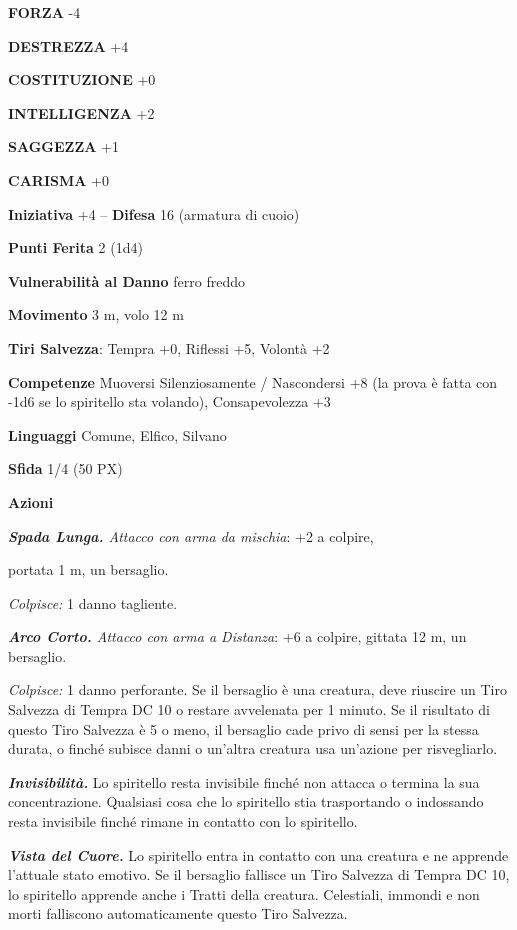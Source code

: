 \begin{multicols}{2}
\textbf{FORZA} -4

\textbf{DESTREZZA} +4

\textbf{COSTITUZIONE} +0

\textbf{INTELLIGENZA} +2

\textbf{SAGGEZZA} +1

\textbf{CARISMA} +0

\textbf{Iniziativa} +4 -- \textbf{Difesa} 16 (armatura di cuoio)

\textbf{Punti Ferita} 2 (1d4)

\textbf{Vulnerabilità al Danno} ferro freddo

\textbf{Movimento} 3 m, volo 12 m

\textbf{Tiri Salvezza}: Tempra +0, Riflessi +5, Volontà +2

\textbf{Competenze} Muoversi Silenziosamente / Nascondersi +8 (la prova è fatta con -1d6 se lo spiritello sta volando), Consapevolezza +3

\textbf{Linguaggi} Comune, Elfico, Silvano

\textbf{Sfida} 1/4 (50 PX)

\textbf{Azioni}

\textit{\textbf{Spada Lunga.} Attacco con arma da mischia}: +2 a colpire,

portata 1 m, un bersaglio.

\textit{Colpisce:} 1 danno tagliente.

\textit{\textbf{Arco Corto.} Attacco con arma a Distanza}: +6 a colpire, gittata 12 m, un bersaglio.

\textit{Colpisce:} 1 danno perforante. Se il bersaglio è una creatura, deve riuscire un Tiro Salvezza di Tempra DC 10 o restare avvelenata per 1 minuto. Se il risultato di questo Tiro Salvezza è 5 o meno, il bersaglio cade privo di sensi per la stessa durata, o finché subisce danni o un'altra creatura usa un'azione per risvegliarlo.

\textit{\textbf{Invisibilità.}} Lo spiritello resta invisibile finché non attacca o termina la sua concentrazione. Qualsiasi cosa che lo spiritello stia trasportando o indossando resta invisibile finché rimane in contatto con lo spiritello.

\textit{\textbf{Vista del Cuore.}} Lo spiritello entra in contatto con una creatura e ne apprende l'attuale stato emotivo. Se il bersaglio fallisce un Tiro Salvezza di Tempra DC 10, lo spiritello apprende anche i Tratti della creatura. Celestiali, immondi e non morti falliscono automaticamente questo Tiro Salvezza.


\end{multicols}
